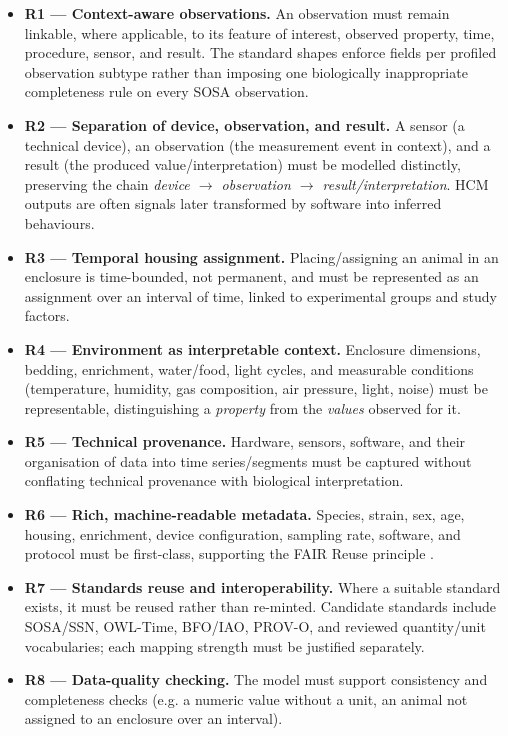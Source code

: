 \begin{itemize}
\item \textbf{R1 --- Context-aware observations.} An observation must remain linkable,
where applicable, to its feature of interest, observed property, time, procedure, sensor, and result. The standard shapes enforce fields per profiled observation subtype rather than imposing one biologically inappropriate completeness rule on every SOSA observation.

\item \textbf{R2 --- Separation of device, observation, and result.} A sensor (a technical
device), an observation (the measurement event in context), and a result (the produced value/interpretation) must be modelled distinctly, preserving the chain \emph{device $\rightarrow$ observation $\rightarrow$ result/interpretation}. HCM outputs are often signals later transformed by software into inferred behaviours.

\item \textbf{R3 --- Temporal housing assignment.} Placing/assigning an animal in an enclosure is
time-bounded, not permanent, and must be represented as an assignment over an interval of time, linked to experimental groups and study factors.

\item \textbf{R4 --- Environment as interpretable context.} Enclosure dimensions, bedding, enrichment, water/food, light cycles, and measurable conditions (temperature, humidity, gas composition, air pressure, light, noise) must be representable, distinguishing a \emph{property} from the \emph{values} observed for it.

\item \textbf{R5 --- Technical provenance.} Hardware, sensors, software, and their
organisation of data into time series/segments must be captured without conflating technical provenance with biological interpretation.

\item \textbf{R6 --- Rich, machine-readable metadata.} Species, strain, sex, age, housing,
enrichment, device configuration, sampling rate, software, and protocol must be first-class, supporting the FAIR Reuse principle \cite{fair,forrest2026}.

\item \textbf{R7 --- Standards reuse and interoperability.} Where a suitable standard
exists, it must be reused rather than re-minted. Candidate standards include SOSA/SSN, OWL-Time, BFO/IAO, PROV-O, and reviewed quantity/unit vocabularies; each mapping strength must be justified separately.

\item \textbf{R8 --- Data-quality checking.} The model must support consistency and
completeness checks (e.g. a numeric value without a unit, an animal not assigned to an enclosure over an interval).

\end{itemize}

